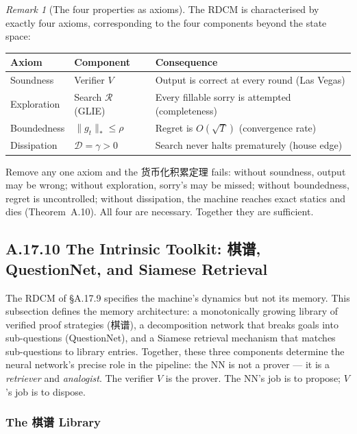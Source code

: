 \documentclass[11pt,a4paper]{article}
\theoremstyle{definition}
\theoremstyle{remark}
\newtheorem{remark}[theorem]{Remark}
\begin{document}
\begin{remark}[The four properties as axioms]
The RDCM is characterised by exactly four axioms, corresponding to the four components beyond the state space:
\begin{center}
\small
\begin{tabularx}{\textwidth}{l l X}
\toprule
\textbf{Axiom} & \textbf{Component} & \textbf{Consequence} \\
\midrule
Soundness & Verifier $V$ & Output is correct at every round (Las Vegas) \\
Exploration & Search $\mathcal{R}$ (GLIE) & Every fillable sorry is attempted (completeness) \\
Boundedness & $\|g_t\|_* \leq \rho$ & Regret is $O(\sqrt{T})$ (convergence rate) \\
Dissipation & $\mathcal{D} = \gamma > 0$ & Search never halts prematurely (house edge) \\
\bottomrule
\end{tabularx}
\end{center}
Remove any one axiom and the 货币化积累定理 fails: without soundness, output may be wrong; without exploration, sorry's may be missed; without boundedness, regret is uncontrolled; without dissipation, the machine reaches exact statics and dies (Theorem~A.10). All four are necessary. Together they are sufficient.
\end{remark}


\subsection{A.17.10 The Intrinsic Toolkit: 棋谱, QuestionNet, and Siamese Retrieval}

The RDCM of \S A.17.9 specifies the machine's dynamics but not its memory. This subsection defines the memory architecture: a monotonically growing library of verified proof strategies (棋谱), a decomposition network that breaks goals into sub-questions (QuestionNet), and a Siamese retrieval mechanism that matches sub-questions to library entries. Together, these three components determine the neural network's precise role in the pipeline: the NN is not a prover --- it is a \emph{retriever} and \emph{analogist}. The verifier $V$ is the prover. The NN's job is to propose; $V$'s job is to dispose.

\subsubsection*{The 棋谱 Library}
\end{document}
